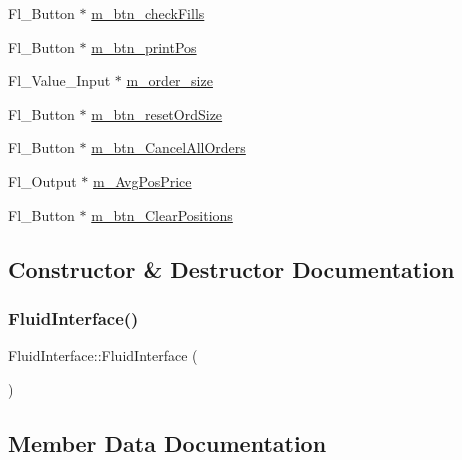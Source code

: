 \begin{DoxyCompactItemize}
\item 
Fl\+\_\+\+Button $\ast$ \hyperlink{class_fluid_interface_a508b3c5a146b4275534b2c6881740282}{m\+\_\+btn\+\_\+check\+Fills}
\item 
Fl\+\_\+\+Button $\ast$ \hyperlink{class_fluid_interface_af62f75d2e5b156fe243becb5635f2bf3}{m\+\_\+btn\+\_\+print\+Pos}
\item 
Fl\+\_\+\+Value\+\_\+\+Input $\ast$ \hyperlink{class_fluid_interface_ae24f85770e0950a85ad3edf40bac3321}{m\+\_\+order\+\_\+size}
\item 
Fl\+\_\+\+Button $\ast$ \hyperlink{class_fluid_interface_a9173a1074dddfe66553518d7caa8f9d1}{m\+\_\+btn\+\_\+reset\+Ord\+Size}
\item 
Fl\+\_\+\+Button $\ast$ \hyperlink{class_fluid_interface_a974f975acf9f9be805e25908978d879b}{m\+\_\+btn\+\_\+\+Cancel\+All\+Orders}
\item 
Fl\+\_\+\+Output $\ast$ \hyperlink{class_fluid_interface_a6106c5c65a144e105a586e989250ffa3}{m\+\_\+\+Avg\+Pos\+Price}
\item 
Fl\+\_\+\+Button $\ast$ \hyperlink{class_fluid_interface_a479ef6af6e3c45db0f51a2b95a065672}{m\+\_\+btn\+\_\+\+Clear\+Positions}
\end{DoxyCompactItemize}


\subsection{Constructor \& Destructor Documentation}
\mbox{\label{class_fluid_interface_a8d908e649929ac29ee7c7ea1d58972be}} 
\subsubsection{\texorpdfstring{Fluid\+Interface()}{FluidInterface()}}
{\footnotesize\ttfamily Fluid\+Interface\+::\+Fluid\+Interface (\begin{DoxyParamCaption}{ }\end{DoxyParamCaption})}



\subsection{Member Data Documentation}
\mbox{\label{class_fluid_interface_a6106c5c65a144e105a586e989250ffa3}} 
